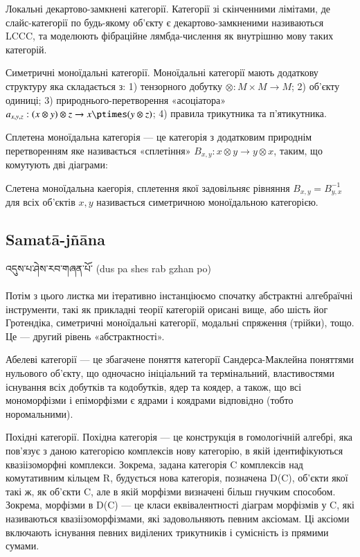 Локальні декартово-замкнені категорії. Категорії зі скінченними лімітами,
де слайс-категорії по будь-якому об'єкту є декартово-замкненими називаються LCCC,
та моделюють фібраційне лямбда-числення як внутрішню мову таких категорій.

Симетричні моноїдальні категорії. Моноїдальні категорії мають додаткову
структуру яка складається з: 1) тензорного добутку $\otimes: M \times M \rightarrow M$;
2) об'єкту одиниці; 3) природнього-перетворення «асоціатора»
$a_{x,y,z}: (x\otimes y)\otimes z \rightarrow x\ptimes(y \otimes z)$;
4) правила трикутника та п'ятикутника.

Сплетена моноїдальна
категорія --- це категорія з додатковим природнім перетворенням
яке називається «сплетіння» $B_{x,y} : x\otimes y \rightarrow y\otimes x$,
таким, що комутують дві діаграми:

Слетена моноїдальна каегорія, сплетення якої задовільняє
рівняння $B_{x,y} = B^{-1}_{y,x}$ для всіх об'єктів $x,y$ називається
симетричною моноїдальною категорією.

\subsection*{Samatā-jñāna}

\ti འདུས་པ་ཤེས་རབ་གཞན་པོ་ \ua (dus pa shes rab gzhan po)\\
\\
Потім з цього листка ми ітеративно інстанціюємо спочатку абстрактні
алгебраїчні інструменти, такі як прикладні теорії категорій орисані
вище, або шість йог Гротендіка, симетричні моноїдальні категорії,
модальні спряження (трійки), тощо. Це --- другий рівень «абстрактності».

Абелеві категорії --- це збагачене поняття категорії Сандерса-Маклейна
поняттями нульового об'єкту, що одночасно ініціальний та термінальний,
властивостями існування всіх добутків та кодобутків, ядер та коядер, а
також, що всі мономорфізми і епіморфізми є ядрами і коядрами
відповідно (тобто норомальними).

Похідні категорії. Похідна категорія --- це конструкція в гомологічній
алгебрі, яка пов'язує з даною категорією комплексів нову категорію,
в якій ідентифікуються квазіізоморфні комплекси. Зокрема, задана
категорія C комплексів над комутативним кільцем R, будується нова
категорія, позначена D(C), об'єкти якої такі ж, як об'єкти C, але
в якій морфізми визначені більш гнучким способом. Зокрема, морфізми
в D(C) --- це класи еквівалентності діаграм морфізмів у C, які
називаються квазіізоморфізмами, які задовольняють певним аксіомам.
Ці аксіоми включають існування певних виділених трикутників і
сумісність із прямими сумами.


